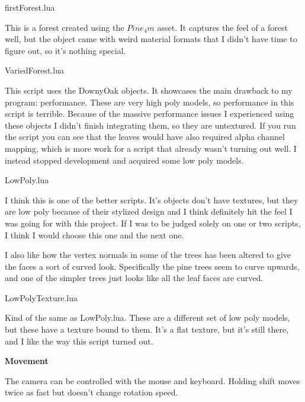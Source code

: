 \documentclass[10pt]{article}
\begin{document}
	\begin{center}
		firstForest.lua
	\end{center}
	
	This is a forest created using the $Pine_4m$ asset. It captures the feel of a forest well, but the object came with weird material formats that I didn't have time to figure out, so it's nothing special.
	
	\begin{center}
		VariedForest.lua
	\end{center}
	
	This script uses the DownyOak objects. It showcases the main drawback to my program: performance. These are very high poly models, so performance in this script is terrible. Because of the massive performance issues I experienced using these objects I didn't finish integrating them, so they are untextured. If you run the script you can see that the leaves would have also required alpha channel mapping, which is more work for a script that already wasn't turning out well. I instead stopped development and acquired some low poly models.
	
	\begin{center}
		LowPoly.lua
	\end{center}
	
	I think this is one of the better scripts. It's objects don't have textures, but they are low poly because of their stylized design and I think definitely hit the feel I was going for with this project. If I was to be judged solely on one or two scripts, I think I would choose this one and the next one.
	
	I also like how the vertex normals in some of the trees has been altered to give the faces a sort of curved look. Specifically the pine trees seem to curve upwards, and one of the simpler trees just looks like all the leaf faces are curved.
	
	\begin{center}
		LowPolyTexture.lua
	\end{center}
	
	Kind of the same as LowPoly.lua. These are a different set of low poly models, but these have a texture bound to them. It's a flat texture, but it's still there, and I like the way this script turned out.
	
	\begin{center}
		\bf Movement
	\end{center}
	The camera can be controlled with the mouse and keyboard. Holding shift moves twice as fast but doesn't change rotation speed.
	
\end{document}
